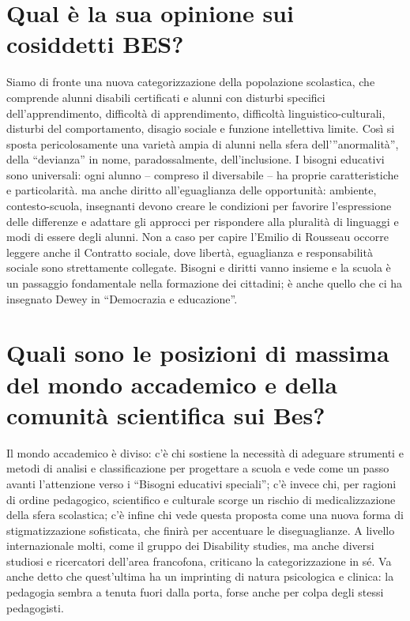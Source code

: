 \section*{Qual è la sua opinione sui cosiddetti BES?}
Siamo di fronte una nuova categorizzazione della popolazione scolastica, che comprende alunni disabili certificati e alunni con disturbi specifici dell'apprendimento, difficoltà di apprendimento, difficoltà linguistico-culturali, disturbi del comportamento, disagio sociale e funzione intellettiva limite. Così si sposta pericolosamente una varietà ampia di alunni nella sfera dell’”anormalità”, della “devianza” in nome, paradossalmente, dell'inclusione. I bisogni educativi sono universali: ogni alunno – compreso il diversabile – ha proprie caratteristiche e particolarità. ma anche diritto all'eguaglianza delle opportunità: ambiente, contesto-scuola, insegnanti devono creare le condizioni per favorire l'espressione delle differenze e adattare gli approcci per rispondere alla pluralità di linguaggi e modi di essere degli alunni. Non a caso per capire l'Emilio di Rousseau occorre leggere anche il Contratto sociale, dove libertà, eguaglianza e responsabilità sociale sono strettamente collegate. Bisogni e diritti vanno insieme e la scuola è un passaggio fondamentale nella formazione dei cittadini; è anche quello che ci ha insegnato Dewey in “Democrazia e educazione”.
\section*{Quali sono le posizioni di massima del mondo accademico e della comunità scientifica sui Bes?}
Il mondo accademico è diviso: c'è chi sostiene la necessità di adeguare strumenti e metodi di analisi e classificazione per progettare a scuola e vede come un passo avanti l'attenzione verso i “Bisogni educativi speciali”; c'è invece chi, per ragioni di ordine pedagogico, scientifico e culturale scorge un rischio di medicalizzazione della sfera scolastica; c'è infine chi vede questa proposta come una nuova forma di stigmatizzazione sofisticata, che finirà per accentuare le diseguaglianze. A livello internazionale molti, come il gruppo dei Disability studies, ma anche diversi studiosi e ricercatori dell'area francofona, criticano la categorizzazione in sé. Va anche detto che quest'ultima ha un imprinting di natura psicologica e clinica: la pedagogia sembra a tenuta fuori dalla porta, forse anche per colpa degli stessi pedagogisti.
